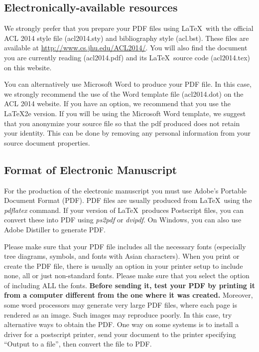 \documentclass[11pt]{article}
\begin{document}
\subsection{Electronically-available resources}

We strongly prefer that you prepare your PDF files using \LaTeX\ with
the official ACL 2014 style file (acl2014.sty) and bibliography style
(acl.bst). These files are available at
\url{http://www.cs.jhu.edu/ACL2014/}. You will also find the document
you are currently reading (acl2014.pdf) and its \LaTeX\ source code
(acl2014.tex) on this website.

You can alternatively use Microsoft Word to produce your PDF file. In
this case, we strongly recommend the use of the Word template file
(acl2014.dot) on the ACL 2014 website. If you have an option, we
recommend that you use the \LaTeX2e version. If you will be
  using the Microsoft Word template, we suggest that you anonymize
  your source file so that the pdf produced does not retain your
  identity.  This can be done by removing any personal information
from your source document properties.



\subsection{Format of Electronic Manuscript}
\label{sect:pdf}

For the production of the electronic manuscript you must use Adobe's
Portable Document Format (PDF). PDF files are usually produced from
\LaTeX\ using the \textit{pdflatex} command. If your version of
\LaTeX\ produces Postscript files, you can convert these into PDF
using \textit{ps2pdf} or \textit{dvipdf}. On Windows, you can also use
Adobe Distiller to generate PDF.

Please make sure that your PDF file includes all the necessary fonts
(especially tree diagrams, symbols, and fonts with Asian
characters). When you print or create the PDF file, there is usually
an option in your printer setup to include none, all or just
non-standard fonts.  Please make sure that you select the option of
including ALL the fonts. \textbf{Before sending it, test your PDF by
  printing it from a computer different from the one where it was
  created.} Moreover, some word processors may generate very large PDF
files, where each page is rendered as an image. Such images may
reproduce poorly. In this case, try alternative ways to obtain the
PDF. One way on some systems is to install a driver for a postscript
printer, send your document to the printer specifying ``Output to a
file'', then convert the file to PDF.
\end{document}

